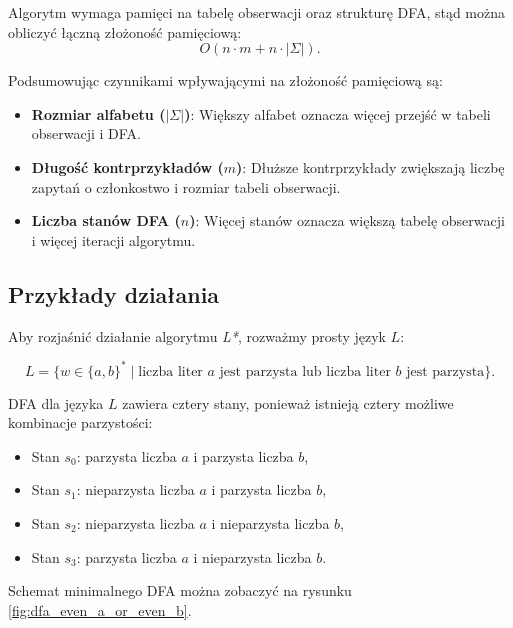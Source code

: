 Algorytm wymaga pamięci na tabelę obserwacji oraz strukturę DFA, stąd można obliczyć łączną złożoność pamięciową:
\[
O(n \cdot m + n \cdot |\Sigma|).
\]

Podsumowując czynnikami wpływającymi na złożoność pamięciową są:
\begin{itemize}
    \item \textbf{Rozmiar alfabetu (\(|\Sigma|\))}: Większy alfabet oznacza więcej przejść w tabeli obserwacji i DFA.
    \item \textbf{Długość kontrprzykładów (\(m\))}: Dłuższe kontrprzykłady zwiększają liczbę zapytań o członkostwo i rozmiar tabeli obserwacji.
    \item \textbf{Liczba stanów DFA (\(n\))}: Więcej stanów oznacza większą tabelę obserwacji i więcej iteracji algorytmu.
\end{itemize}

\subsection{Przykłady działania}

Aby rozjaśnić działanie algorytmu \textit{L*}, rozważmy prosty język $L$:

\[
L = \{ w \in \{a, b\}^* \mid \text{liczba liter } a \text{ jest parzysta lub liczba liter } b \text{ jest parzysta} \}.
\]

DFA dla języka $L$ zawiera cztery stany, ponieważ istnieją cztery możliwe kombinacje parzystości:
\begin{itemize}
    \item Stan $s_0$: parzysta liczba $a$ i parzysta liczba $b$,
    \item Stan $s_1$: nieparzysta liczba $a$ i parzysta liczba $b$,
    \item Stan $s_2$: nieparzysta liczba $a$ i nieparzysta liczba $b$,
    \item Stan $s_3$: parzysta liczba $a$ i nieparzysta liczba $b$.
\end{itemize}

Schemat minimalnego DFA można zobaczyć na rysunku \ref{fig:dfa_even_a_or_even_b}.

